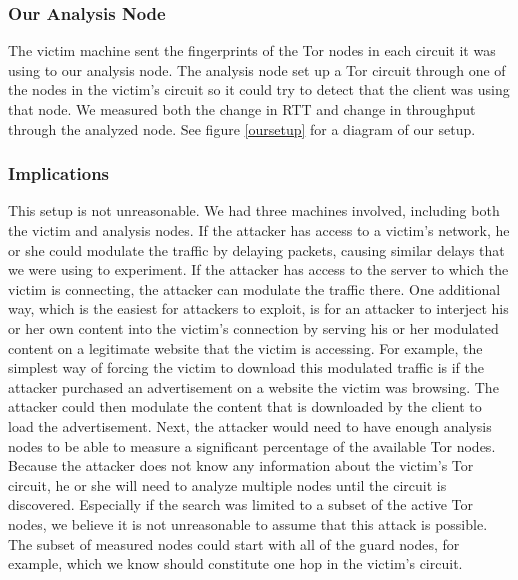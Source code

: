 \documentclass[12pt,journal]{IEEEtran}
\begin{document}
\subsubsection{Our Analysis Node}The victim machine sent the fingerprints of the Tor nodes in each circuit it was using to our analysis node. The analysis node set up a Tor circuit through one of the nodes in the victim’s circuit so it could try to detect that the client was using that node. We measured both the change in RTT and change in throughput through the analyzed node. See figure \ref{oursetup} for a diagram of our setup.
\subsubsection{Implications}
This setup is not unreasonable. We had three machines involved, including both the victim and analysis nodes. If the attacker has access to a victim’s network, he or she could modulate the traffic by delaying packets, causing similar delays that we were using to experiment. If the attacker has access to the server to which the victim is connecting, the attacker can modulate the traffic there.
One additional way, which is the easiest for attackers to exploit, is for an attacker to interject his or her own content into the victim’s connection by serving his or her modulated content on a legitimate website that the victim is accessing. For example, the simplest way of forcing the victim to download this modulated traffic is if the attacker purchased an advertisement on a website the victim was browsing. The attacker could then modulate the content that is downloaded by the client to load the advertisement.
Next, the attacker would need to have enough analysis nodes to be able to measure a significant percentage of the available Tor nodes. Because the attacker does not know any information about the victim’s Tor circuit, he or she will need to analyze multiple nodes until the circuit is discovered. Especially if the search was limited to a subset of the active Tor nodes, we believe it is not unreasonable to assume that this attack is possible. The subset of measured nodes could start with all of the guard nodes, for example, which we know should constitute one hop in the victim’s circuit.

\printbibliography
\end{document}
